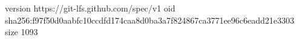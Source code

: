 version https://git-lfs.github.com/spec/v1
oid sha256:f97f50d0aabfc10ccdfd174caa8d0ba3a7f824867ca3771ee96c6eadd21e3303
size 1093
